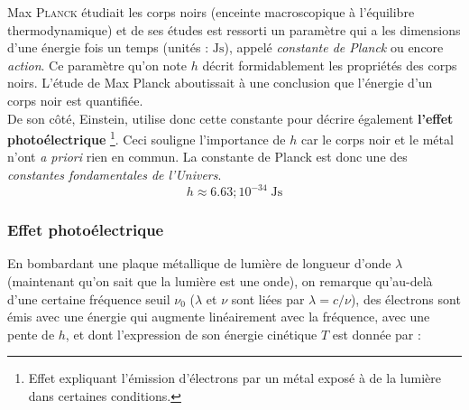 \documentclass[12pt, a4paper]{book}
\begin{document}
Max \textsc{Planck} étudiait les corps noirs (enceinte macroscopique à l'équilibre thermodynamique) {\color{blue}{Je définirais le corps noir plutôt comme ça : enceinte macroscopique qui absorbe entièrement tout rayonnement incident, à l'équilibre thermodynamique entre la matière qui le constitue et son propre rayonnement}} et de ses études est ressorti un paramètre qui a les dimensions d'une énergie fois un temps (unités : $\mathrm{Js}$), appelé \textit{constante de Planck} ou encore \textit{action}. 
Ce paramètre qu'on note $h$ décrit formidablement les propriétés des corps noirs. L'étude de Max Planck aboutissait à une conclusion que l'énergie d'un corps noir est quantifiée. {\color{blue}{Je changerais perso la dernière phrase, à première vue on comprend pas en quoi l'énergie est quantifiée je trouve. Pour expliquer son étude, je mettrai plutôt : En fait, avant le travail de Max Planck, l'expression de l'énergie du rayonnement d'un corps noir divergeait à hautes fréquences (c'est ce qu'on appelait la catastrophe ultra-violette) ; son étude a donc permis de rectifier cela, en une expression de l'énergie dépendant de la fréquence, 
faisant intervenir cette fameuse constante $h$, et étant totalement cohérente avec les mesures expérimentales, autant à haute fréquence qu'à basse fréquence. Une première hypothèse sur la quantification de l'énergie a dès lors été émise par Planck, qui sera ensuite repris et démontré par Einstein.}} \\
De son côté, Einstein, utilise donc cette constante pour décrire également \textbf{l'effet photoélectrique} \footnote{Effet expliquant l'émission d'électrons par un métal exposé à de la lumière dans certaines conditions.}. Ceci souligne l'importance de $h$ car le corps noir et le métal n'ont \textit{a priori} rien en commun. La constante de Planck est donc une des \textit{constantes fondamentales de l'Univers}.
$$h \approx 6.63 ; 10^{-34} \; \mathrm{Js}$$

\subsubsection{Effet photoélectrique}
En bombardant une plaque métallique de lumière de longueur d'onde $\lambda$ (maintenant qu'on sait que la lumière est une onde), on remarque qu'au-delà d'une certaine fréquence seuil $\nu_0$ ($\lambda$ et $\nu$ sont liées par $\lambda = c/\nu$), des électrons sont émis avec une énergie qui augmente linéairement avec la fréquence, avec une pente de $h$, et dont l'expression de son énergie cinétique $T$ est donnée par :
\end{document}
